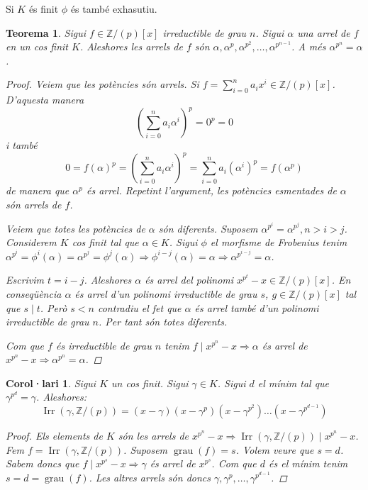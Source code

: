 \documentclass[a4paper,11pt]{report}
\DeclareMathOperator{\irr}{Irr}
\renewcommand{\div}{\mid}
\DeclareMathOperator{\grau}{grau}
\newcommand{\im}{\Rightarrow}
\theoremstyle{theorem}
\newtheorem{teorema}{\normalfont \sffamily\bfseries Teorema}[section]
\newtheorem{col}{\normalfont \sffamily\bfseries Corol·lari}[section]
\theoremstyle{definition}
\begin{document}
Si $K$ és finit $\phi$ és també exhasutiu.
\begin{teorema} Sigui $f\in \mathbb{Z}/(p)[x]$ irreductible de grau $n$. Sigui $\alpha$ una arrel de $f$ en un cos finit $K$. Aleshores les arrels de $f$ són $\alpha,\alpha^p,\alpha^{p^2},\ldots,\alpha^{p^{n-1}}$. A més $\alpha^{p^n}=\alpha$.\begin{proof}
		
		Veiem que les potències són arrels. Si $f=\sum_{i=0}^{n}a_ix^i\in\mathbb{Z}/(p)[x]$. D'aquesta manera $$(\sum_{i=0}^{n}a_i\alpha^i)^p=0^p=0$$
		i també $$0=f(\alpha)^p=(\sum_{i=0}^{n}a_i\alpha^i)^p=\sum_{i=0}^{n}a_i(\alpha^i)^p=f(\alpha^p)$$ de manera que $\alpha^p$ és arrel. Repetint l'argument, les potències esmentades de $\alpha$ són arrels de $f$.
		
		Veiem que totes les potències de $\alpha$ són diferents. Suposem $\alpha^{p^i}=\alpha^{p^j},n>i>j$. Considerem $K$ cos finit tal que $\alpha \in K$. Sigui $\phi$ el morfisme de Frobenius tenim $\alpha^{p^i}=\phi^i(\alpha)=\alpha^{p^j}=\phi^j(\alpha)\im \phi^{i-j}(\alpha)=\alpha\im \alpha^{p^{i-j}}=\alpha$.
		
		Escrivim $t=i-j$. Aleshores $\alpha$ és arrel del polinomi $x^{p^t}-x\in \mathbb{Z}/(p)[x]$. En conseqüència $\alpha$ és arrel d'un polinomi irreductible de grau $s$, $g\in \mathbb{Z}/(p)[x]$ tal que $s\div t$. Però $s<n$ contradiu el fet que $\alpha$ és arrel també d'un polinomi irreductible de grau $n$. Per tant són totes diferents.
		
		Com que $f$ és irreductible de grau $n$ tenim $f\div x^{p^n}-x\im \alpha$ és arrel de $x^{p^n}-x\im \alpha^{p^n}=\alpha$.
		\end{proof}
\end{teorema}
\begin{col}
	Sigui $K$ un cos finit. Sigui $\gamma\in K$. Sigui $d$ el mínim tal que $\gamma^{p^d}=\gamma$. Aleshores:$$\irr(\gamma,\mathbb{Z}/(p))=(x-\gamma)(x-\gamma^p)(x-\gamma^{p^2})\ldots(x-\gamma^{p^{d-1}})$$
	\begin{proof}
		Els elements de $K$ són les arrels de $x^{p^n}-x\im \irr(\gamma,\mathbb{Z}/(p))\div x^{p^n}-x$. Fem $f=\irr(\gamma,\mathbb{Z}/(p))$. Suposem $\grau(f)=s$. Volem veure que $s=d$. Sabem doncs que $f\div x^{p^s}-x\im \gamma $ és arrel de $x^{p^s}$. Com que $d$ és el mínim tenim $s=d=\grau(f)$. Les altres arrels són doncs $\gamma,\gamma^p,\ldots,\gamma^{p^{d-1}}$.	\end{proof}
\end{col}
\end{document}
